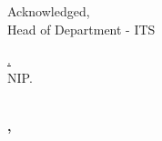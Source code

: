 \vspace{-1ex}
\begin{center}
  Acknowledged, \\
  Head of \engdepartment{} Department \engfacultyshort{} - ITS \\

  \vspace{5ex}

  \underline{\headofdepartment{}.} \\
  NIP. \headofdepartmentnip{}
\end{center}

\vspace{-1ex}
\begin{center}
  \textbf{\MakeUppercase{\place{}}\\\ENGMONTH{}, \the\year{}}
\end{center}
\endgroup
